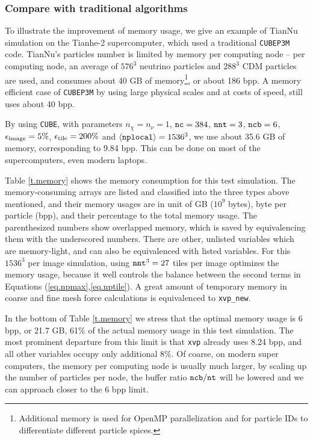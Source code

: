 \documentclass[10pt,twocolumn,preprint]{emulateapj}
\begin{document}
\subsubsection{Compare with traditional algorithms}
To illustrate the improvement of memory usage, we give an example of TianNu simulation \citep{2017NatAs...1E.143Y} on the Tianhe-2 supercomputer, which used a traditional {\tt CUBEP3M} code. TianNu's particles number is limited by memory per computing node -- per computing node, an average of $576^3$ neutrino particles and $288^3$ CDM particles are used, and consumes about 40 GB of memory\footnote{Additional memory is used for OpenMP parallelization and for particle IDs to differentiate different particle spices.}, or about 186 bpp. A memory efficient case of {\tt CUBEP3M} by using large physical scales and at costs of speed, still uses about 40 bpp. 

By using {\tt CUBE}, with parameters $n_\chi=n_\nu=1$, ${\tt nc}=384$, ${\tt nnt}=3$, ${\tt ncb}=6$, $\epsilon_{\rm image}=5\%$, $\epsilon_{\rm tile}=200\%$ and $\left\langle {\tt nplocal} \right\rangle=1536^3$, we use about 35.6 GB of memory, corresponding to 9.84 bpp. This can be done on most of the supercomputers, even modern laptops.

Table \ref{t.memory} shows the memory consumption for this test simulation. The memory-consuming arrays are listed and classified into the three types above mentioned, and their memory usages are in unit of GB ($10^9$ bytes), byte per particle (bpp), and their percentage to the total memory usage. The parenthesized numbers show overlapped memory, which is saved by equivalencing them with the underscored numbers. There are other, unlisted variables which are memory-light, and can also be equivalenced with listed variables. For this $1536^3$ per image simulation, using ${\tt nnt}^3=27$ tiles per image optimizes the memory usage, because it well controls the balance between the second terms in Equations (\ref{eq.npmax},\ref{eq.nptile}). A great amount of temporary memory in coarse and fine mesh force calculations is equivalenced to {\tt xvp\_new}.

In the bottom of Table \ref{t.memory} we stress that the optimal memory usage is 6 bpp, or 21.7 GB, 61\% of the actual memory usage in this test simulation. The most prominent departure from this limit is that {\tt xvp} already uses 8.24 bpp, and all other variables occupy only additional 8\%. Of coarse, on modern super computers, the memory per computing node is usually much larger, by scaling up the number of particles per node, the buffer ratio ${\tt ncb}/{\tt nt}$ will be lowered and we can approach closer to the 6 bpp limit.
\end{document}
